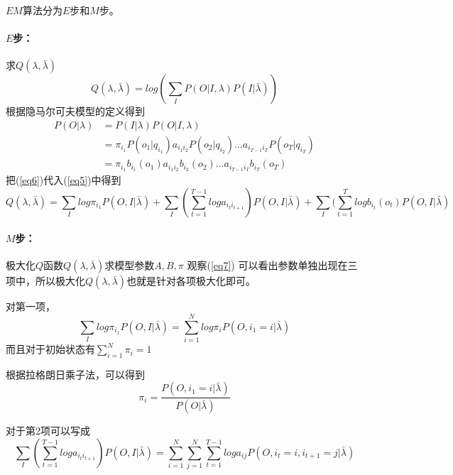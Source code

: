 \documentclass[a4paper,12pt]{ctexart}     %
\begin{document}
		$ EM $算法分为$ E $步和$ M $步。
		\paragraph{$ E $步：}
		
		求$ Q(\lambda,\bar{\lambda}) $
		\begin{equation}\label{eq5}
			Q(\lambda,\bar{\lambda})
			= log(\sum_{I}P(O|I,\lambda)P(I|\bar{\lambda}))
		\end{equation}
	根据隐马尔可夫模型的定义得到
	\begin{equation}\label{eq6}
		\begin{split}
			P(O|\lambda) &= P(I|\lambda)P(O|I,\lambda)\\
			&= \pi_{i_1}P(o_1|q_{i_1})a_{i_1i_2}P(o_2|q_{i_2})\dots a_{i_{T-1}i_T}P(o_T|q_{i_T})\\
			&= \pi_{i_1}b_{i_1}(o_1)a_{i_1i_2}b_{i_2}(o_2)\dots a_{i_{T-1}i_T}b_{i_T}(o_T)
		\end{split}
	\end{equation}
	把(\ref{eq6})代入(\ref{eq5})中得到
		\begin{equation}\label{eq7}
				Q(\lambda,\bar{\lambda})
				=\sum_Ilog\pi_{i_1}P(O,I|\bar{\lambda})+\sum_I(\sum_{t=1}^{T-1}loga_{i_ti_{t+1}})P(O,I|\bar{\lambda})+\sum_I(\sum_{t=1}^Tlogb_{i_t}(o_t)P(O,I|\bar{\lambda})	
		\end{equation}
		\paragraph{$ M $步：}
		极大化$ Q $函数$ Q(\lambda,\bar{\lambda}) $求模型参数$ A,B,\pi $
		观察(\ref{eq7}) 可以看出参数单独出现在三项中，所以极大化$ Q(\lambda,\bar{\lambda}) $也就是针对各项极大化即可。
		
		对第一项，
		\begin{equation}
			\sum_Ilog\pi_{i_1}P(O,I|\bar{\lambda})
			= \sum_{i=1}^{N}log\pi_iP(O,i_1 = i|\bar{\lambda})
		\end{equation}
	而且对于初始状态有$ \sum_{i=1}^{N}\pi_i =1$ 
	
	根据拉格朗日乘子法，可以得到
	\begin{equation}
		\pi_i = \frac{P(O,i_1 = i|\bar{\lambda})}{P(O|\bar{\lambda})}
	\end{equation}

	对于第2项可以写成
	\begin{equation}
		\sum_I(\sum_{t=1}^{T-1}loga_{i_ti_{t+1}})P(O,I|\bar{\lambda}) = \sum_{i=1}^{N}\sum_{j=1}^{N}\sum_{t=1}^{T-1}loga_{ij}P(O,i_t=i,i_{t+1} = j|\bar{\lambda})
	\end{equation}
\end{document}
